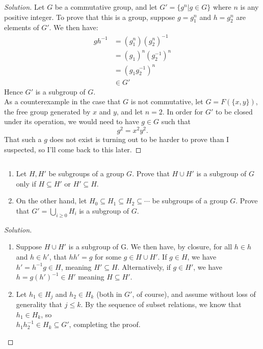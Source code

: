 \documentclass[12pt]{article}
\newenvironment{problem}[2][Problem]{\begin{trivlist}
\item[\hskip \labelsep {\bfseries #1}\hskip \labelsep {\bfseries #2.}]}{\end{trivlist}}
\newenvironment{solution}
  {\renewcommand\qedsymbol{$\blacksquare$}\begin{proof}[Solution]}
{\end{proof}}
\begin{document}
\begin{solution}
  Let $G$ be a commutative group, and let $G' = \{g^n | g\in G\}$  where $n$ is any positive integer.
  To prove that this is a group, suppose $g = g_1^n$ and $h=g_2^n$ are elements of $G'$.
  We then have:
  \begin{align*}
    gh^{-1} &= (g_1^n)(g_2^n)^{-1} \\
    &= (g_1)^n(g_2^{-1})^n \\
      &= (g_1g_2^{-1} )^n \\
      &\in G'
  \end{align*}
  Hence $G'$ is a subgroup of $G$. \\
  As a counterexample in the case that $G$ is not commutative, let $G = F(\{x,y\})$, the free group generated
  by $x$ and $y$, and let $n=2$. 
  In order for $G'$ to be closed under its operation, we would need to have $g\in G$ such that
  $$g^2=x^2y^2.$$
  That such a $g$ does not exist is turning out to be harder to prove than I suspected, so I'll come back to this later.
\end{solution}
\begin{problem}{6.6}$ $
  \begin{enumerate}
    \item Let $H,H'$ be subgroups of a group $G$.
      Prove that $H\cup H'$ is a subgroup of $G$ only if $H\subseteq H'$ or $H'\subseteq H$.
    \item On the other hand, let $H_0\subseteq H_1\subseteq H_2\subseteq\cdots$ 
      be subgroups of a group $G$.
      Prove that $G'=\bigcup_{i\geq0}H_i$ is a subgroup of $G$.
  \end{enumerate}
\end{problem}
\begin{solution} $ $
  \begin{enumerate}
    \item Suppose $H\cup H'$ is a subgroup of G. 
      We then have, by closure, for all $h\in h$ and $h\in h'$, that $hh' = g$ for some $g\in H\cup H'$.
      If $g\in H$, we have $h' = h^{-1}g \in H$, meaning $H'\subseteq H$.
      Alternatively, if $g\in H'$, we have $h = g(h')^{-1} \in H'$ meaning $H\subseteq H'$.
    \item Let $h_1\in H_j$ and $h_2\in H_k$ (both in $G'$, of course),
        and assume without loss of generality that $j\leq k$.
        By the sequence of subset relations, we know that $h_1\in H_k$, so \\$h_1h_2^{-1}\in H_k \subseteq G'$,
        completing the proof.
  \end{enumerate}
\end{solution}
\end{document}

